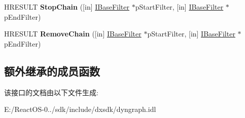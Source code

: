 \begin{DoxyCompactItemize}
\item 
\mbox{\label{interface_i_filter_chain_a8a05cfed16246fe01af19e4a2fe88d88}} 
H\+R\+E\+S\+U\+LT {\bfseries Stop\+Chain} (\mbox{[}in\mbox{]} \hyperlink{interface_i_base_filter}{I\+Base\+Filter} $\ast$p\+Start\+Filter, \mbox{[}in\mbox{]} \hyperlink{interface_i_base_filter}{I\+Base\+Filter} $\ast$p\+End\+Filter)
\item 
\mbox{\label{interface_i_filter_chain_a9441b421c84e989188e3fef73cf29553}} 
H\+R\+E\+S\+U\+LT {\bfseries Remove\+Chain} (\mbox{[}in\mbox{]} \hyperlink{interface_i_base_filter}{I\+Base\+Filter} $\ast$p\+Start\+Filter, \mbox{[}in\mbox{]} \hyperlink{interface_i_base_filter}{I\+Base\+Filter} $\ast$p\+End\+Filter)
\end{DoxyCompactItemize}
\subsection*{额外继承的成员函数}


该接口的文档由以下文件生成\+:\begin{DoxyCompactItemize}
\item 
E\+:/\+React\+O\+S-\/0../sdk/include/dxsdk/dyngraph.\+idl\end{DoxyCompactItemize}
